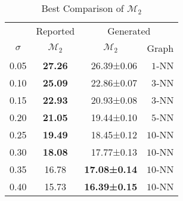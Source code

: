 \documentclass[a4paper, 10pt]{article}
\begin{document}
\begin{minipage}{0.47\linewidth}
	\begin{table}[H]
		\small
		\centering{}
		\caption{Best Comparison of \(\mathcal{M}_2\)}\label{tab:best:m2}
		\begin{tabular}{ccrr}\toprule
			            & Reported          & \multicolumn{2}{c}{Generated}                                     \\ \cmidrule(l){2-2}\cmidrule(l){3-4}
			\(\sigma \) & \(\mathcal{M}_2\) & \multicolumn{1}{c}{\(\mathcal{M}_2\)} & \multicolumn{1}{c}{Graph} \\ \midrule
			0.05        & \textbf{27.26}    & 26.39±0.06                            & \(1\)-NN                  \\
			0.10        & \textbf{25.09}    & 22.86±0.07                            & \(3\)-NN                  \\
			0.15        & \textbf{22.93}    & 20.93±0.08                            & \(3\)-NN                  \\
			0.20        & \textbf{21.05}    & 19.44±0.10                            & \(5\)-NN                  \\
			0.25        & \textbf{19.49}    & 18.45±0.12                            & \(10\)-NN                 \\
			0.30        & \textbf{18.08}    & 17.77±0.13                            & \(10\)-NN                 \\
			0.35        & 16.78             & \textbf{17.08±0.14}                   & \(10\)-NN                 \\
			0.40        & 15.73             & \textbf{16.39±0.15}                   & \(10\)-NN                 \\
			\bottomrule
		\end{tabular}
	\end{table}
\end{minipage}

\printbibliography{}
\end{document}
